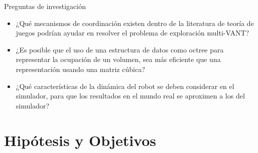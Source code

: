 \documentclass[
  24pt, %
  aspectratio=169, %
]{beamer}
\begin{document}
\begin{frame}{Preguntas de investigación}
  
  \begin{itemize}

  \item ¿Qué mecanismos de coordinación existen dentro de la literatura de teoría de juegos podrían ayudar en resolver el problema de exploración multi-VANT?
  \item ¿Es posible que el uso de una estructura de datos como octree para representar la ocupación de un volumen, sea más eficiente que una representación usando una matriz cúbica?
  \item ¿Qué características de la dinámica del robot se deben considerar en el simulador, para que los resultados en el mundo real se aproximen a los del simulador?
    
  \end{itemize}
\end{frame}

\section{Hipótesis y Objetivos}
\end{document}
